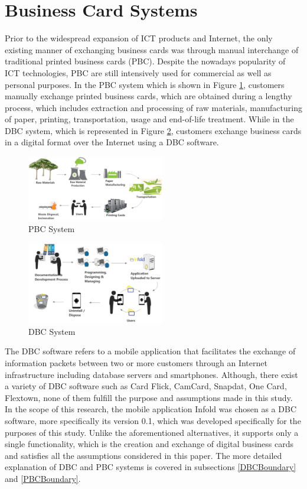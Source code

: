 \documentclass[conference]{IEEEtran}
\begin{document}
\section{Business Card Systems}

Prior to the widespread expansion of ICT products and Internet, the only existing manner of exchanging business cards was through manual interchange of traditional printed business cards (PBC). Despite the nowadays popularity of ICT technologies, PBC are still intensively used for commercial as well as personal purposes. In the PBC system which is shown in Figure \ref{PBCSystem}, customers manually exchange printed business cards, which are obtained during a lengthy process, which includes extraction and processing of raw materials, manufacturing of paper, printing, transportation, usage and end-of-life treatment. While in the DBC system, which is represented in Figure \ref{DBCSystem}, customers exchange business cards in a digital format over the Internet using a DBC software.

\begin{figure}[h]
\centering
\includegraphics[width=6cm]{PBCSystem1.png}
\caption{PBC System}
\label{PBCSystem}
\end{figure}

\begin{figure}[h]
\centering
\includegraphics[width=6cm]{DBCSystem.png}
\caption{DBC System}
\label{DBCSystem}
\end{figure}
The DBC software refers to a mobile application that facilitates the exchange of information packets between two or more customers through an Internet infrastructure including database servers and smartphones. Although, there exist a variety of DBC software such as Card Flick, CamCard, Snapdat, One Card, Flextown, none of them fulfill the purpose and assumptions made in this study. In the scope of this research, the mobile application Infold was chosen as a DBC software, more specifically its version 0.1, which was developed specifically for the purposes of this study. Unlike the aforementioned alternatives, it supports only a single functionality, which is the creation and exchange of digital business cards and satisfies all the assumptions considered in this paper. The more detailed explanation of DBC and PBC systems is covered in subsections \ref{DBCBoundary} and \ref{PBCBoundary}.
\end{document}
